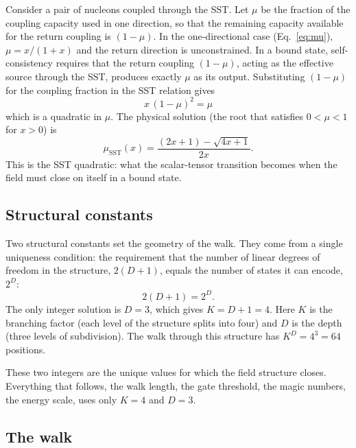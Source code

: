 \documentclass[fleqn,usenatbib]{mnras}
\begin{document}
Consider a pair of nucleons coupled through the SST. Let $\mu$ be the fraction of the coupling capacity used in one direction, so that the remaining capacity available for the return coupling is $(1 - \mu)$. In the one-directional case (Eq.~\ref{eq:mu}), $\mu = x/(1+x)$ and the return direction is unconstrained. In a bound state, self-consistency requires that the return coupling $(1 - \mu)$, acting as the effective source through the SST, produces exactly $\mu$ as its output. Substituting $(1-\mu)$ for the coupling fraction in the SST relation gives
\begin{equation}
x\,(1 - \mu)^2 = \mu
\label{eq:selfconsistent}
\end{equation}
which is a quadratic in $\mu$. The physical solution (the root that satisfies $0 < \mu < 1$ for $x > 0$) is
\begin{equation}
\mu_{\mathrm{SST}}(x) = \frac{(2x+1) - \sqrt{4x+1}}{2x}.
\label{eq:musst}
\end{equation}
This is the SST quadratic: what the scalar-tensor transition becomes when the field must close on itself in a bound state.

\subsection{Structural constants}
\label{sec:constants}

Two structural constants set the geometry of the walk. They come from a single uniqueness condition: the requirement that the number of linear degrees of freedom in the structure, $2(D+1)$, equals the number of states it can encode, $2^D$:
\begin{equation}
2(D+1) = 2^D.
\label{eq:uniqueness}
\end{equation}
The only integer solution is $D = 3$, which gives $K = D + 1 = 4$. Here $K$ is the branching factor (each level of the structure splits into four) and $D$ is the depth (three levels of subdivision). The walk through this structure has $K^D = 4^3 = 64$ positions.

These two integers are the unique values for which the field structure closes. Everything that follows, the walk length, the gate threshold, the magic numbers, the energy scale, uses only $K\!=\!4$ and $D\!=\!3$.

\subsection{The walk}
\label{sec:walk}
\end{document}

